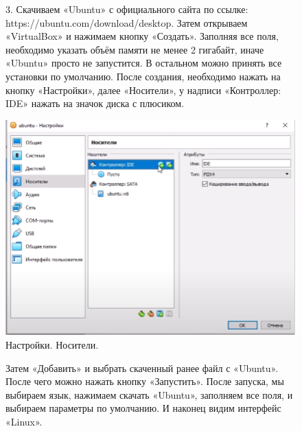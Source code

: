 \documentclass[oneside,final,12pt]{extarticle} %
\begin{document}
\begin{figure}
3. Скачиваем «Ubuntu» с официального сайта по ссылке: https://ubuntu.com/download/desktop. Затем открываем «VirtualBox» и нажимаем кнопку «Создать». Заполняя все поля, необходимо указать объём памяти не менее 2 гигабайт, иначе «Ubuntu» просто не запустится. В остальном можно принять все установки по умолчанию. После создания, необходимо нажать на кнопку «Настройки», далее «Носители», у надписи «Контроллер: IDE» нажать на значок диска с плюсиком. 

		\centering
		\includegraphics[width=0.65\linewidth]{img/4.png}
\caption{Настройки. Носители.}
\label{ris:image}

\end{figure}

\begin{figure}
\quad Затем «Добавить» и выбрать скаченный ранее файл с «Ubuntu». После чего можно нажать кнопку «Запустить». После запуска, мы выбираем язык, нажимаем скачать «Ubuntu», заполняем все поля, и выбираем параметры по умолчанию. И наконец видим интерфейс «Linux».
\end{figure}
\end{document}
